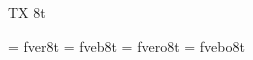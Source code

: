 
\ifx\ffdecl\undefined  \fi

\ffdecl [Bera] {\rm \bf \it \bi} {\sans} {} {TX} {8t}

\def\sans{\ffsetV{sans}{s}\ffsetX}    \def\nosans{\ffsetV{sans}{e}\ffsetX}
\def\sansV{e} 

\ismacro{}\ifttrue

   \font\tenrm = fver8t  \sizespec
   \font\tenbf = fveb8t  \sizespec
   \font\tenit = fvero8t \sizespec
   \font\tenbi = fvebo8t \sizespec

   \def\ffnamegen{fv\sansV \ffvarV 8t}

\fi
\tenrm %

\def\sserif{\sans\fam}

\ifx\loadmathfonts\relax \endinput \fi
\ifx\mathpreloaded X\else  \fi                     

\endinput
